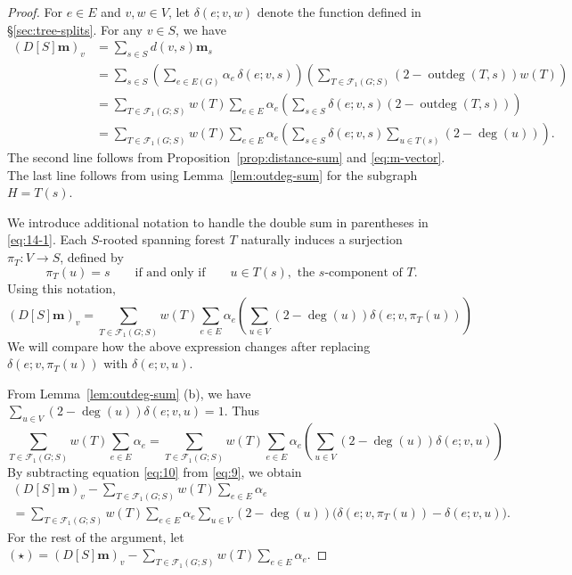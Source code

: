 \documentclass[12pt]{amsart}
\theoremstyle{definition}
\newcommand{\boldm}{\mathbf{m}}
\newcommand{\trees}{\mathcal{F}_1}
\DeclareMathOperator{\outdeg}{outdeg}
\begin{document}
\begin{proof}
For $e\in E$ and $v,w\in V$, let $\delta(e;v,w)$ denote the function defined in \S\ref{sec:tree-splits}.
For any $v \in S$, we have
\begin{align}
  (D[S] \boldm)_v &= \sum_{s \in S} d(v,s) \boldm_s \\
  &= \sum_{s \in S} \left( \sum_{e \in E(G)} \alpha_e\, \delta(e; v,s) \right) \left( \sum_{T \in \trees(G;S)} (2 - \outdeg(T,s)) w({T}) \right) \\
  &= \sum_{T\in \trees(G;S)} w({T}) \sum_{e\in E} \alpha_e \left( \sum_{s \in S} \delta(e; v,s) (2 - \outdeg(T, s)) \right) \\
  &= \sum_{T \in \trees(G;S)} w({T}) \sum_{e \in E} \alpha_e \left( \sum_{s \in S} \delta(e; v,s) \sum_{u \in T(s)} (2 - \deg(u)) \right). \label{eq:14-1}
\end{align}
The second line follows from Proposition~\ref{prop:distance-sum} and \eqref{eq:m-vector}. 
The last line follows from using Lemma~\ref{lem:outdeg-sum} for the subgraph $H = T(s)$.

We introduce additional notation to handle the double sum in parentheses in \eqref{eq:14-1}.
Each $S$-rooted spanning forest $T$ naturally induces a surjection $\pi_T\colon V \to S$, defined by 
\[
	\pi_T(u) = s \qquad\text{if and only if}\qquad u \in T(s), \text{ the $s$-component of $T$}.
\]
Using this notation,
\begin{equation}
\label{eq:9}
	(D[S] \boldm)_v = \sum_{T \in \trees(G;S)} w({T}) \sum_{e \in E} \alpha_e \left( \sum_{u \in V} (2 - \deg(u)) \delta(e; v,\pi_T(u)) \right)
\end{equation}
We will compare how the above expression changes after replacing $\delta(e; v,\pi_T(u))$ with $\delta(e; v, u)$.

From Lemma~\ref{lem:outdeg-sum} (b), 
we have
$\displaystyle
	\sum_{u \in V} (2 - \deg(u)) \delta(e; v,u)
	= 1. 
$
Thus
\begin{equation}
\label{eq:10}
	\sum_{T \in \trees(G;S)} w({T}) \sum_{e \in E} \alpha_e
	= \sum_{T \in \trees(G;S)} w({T}) \sum_{e \in E} \alpha_e \left( \sum_{u \in V} (2 - \deg(u)) \delta(e; v,u) \right) 
\end{equation}
By subtracting equation \eqref{eq:10} from \eqref{eq:9}, we obtain
\begin{multline}\label{eq:subtract-delta-diff}
	(D[S] \boldm)_v - \sum_{T \in \trees(G;S)} w({T}) \sum_{e \in E} \alpha_e \\
	= \sum_{T \in \trees(G;S)} w({T}) \sum_{e \in E} \alpha_e \sum_{u \in V} (2 - \deg(u)) \Big(\delta(e; v, \pi_T(u)) - \delta(e; v, u) \Big).
\end{multline}
For the rest of the argument, let
$\displaystyle
	(\star) = (D[S] \boldm)_v - \sum_{T \in \trees(G;S)} w({T}) \sum_{e \in E} \alpha_e.
$



\end{proof}
\end{document}

